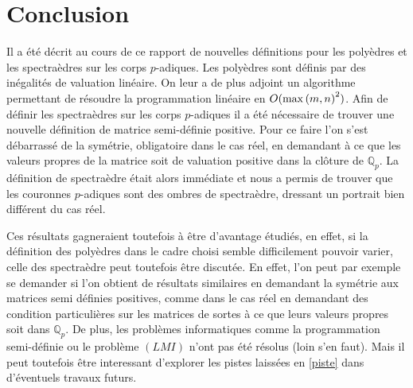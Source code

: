 \section{Conclusion}
Il a été décrit au cours de ce rapport de nouvelles définitions pour les polyèdres et les spectraèdres sur les corps $p$-adiques. Les polyèdres sont définis par des inégalités de valuation linéaire. On leur a de plus adjoint un algorithme permettant de résoudre la programmation linéaire en $O( \max\left( m,n \right)^2)$. Afin de définir les spectraèdres sur les corps $p$-adiques il a été nécessaire de trouver une nouvelle définition de matrice semi-définie positive. Pour ce faire l'on s'est débarrassé de la symétrie, obligatoire dans le cas réel, en demandant à ce que les valeurs propres de la matrice soit de valuation positive dans la clôture de $\mathbb{Q}_{p}$. La définition de spectraèdre était alors immédiate et nous a permis de trouver que les couronnes $p$-adiques sont des ombres de spectraèdre, dressant un portrait bien différent du cas réel.

Ces résultats gagneraient toutefois à être d'avantage étudiés, en effet, si la définition des polyèdres dans le cadre choisi semble difficilement pouvoir varier, celle des spectraèdre peut toutefois être discutée. En effet, l'on peut par exemple se demander si l'on obtient de résultats similaires en demandant la symétrie aux matrices semi définies positives, comme dans le cas réel en demandant des condition particulières sur les matrices de sortes à ce que leurs valeurs propres soit dans $\mathbb{Q}_{p} $. De plus, les problèmes informatiques comme la programmation semi-définie ou le problème $\left( LMI \right) $ n'ont pas été résolus (loin s'en faut). Mais il peut toutefois être interessant d'explorer les pistes laissées en \ref{piste} dans d'éventuels travaux futurs. 
